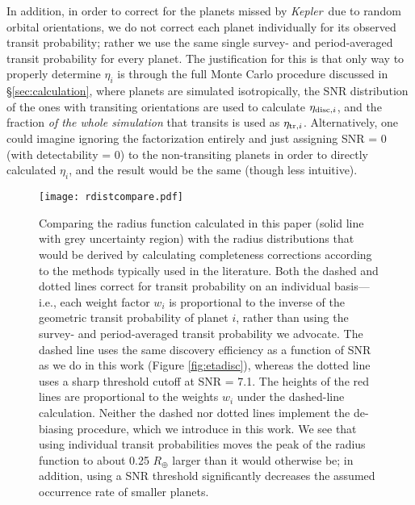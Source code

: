 \documentclass[iop]{emulateapj}
\def\Kepler{\textit{Kepler}}
\def\Rearth{R_\oplus}
\begin{document}
In addition, in order to correct for the planets missed by \Kepler\ due to random orbital orientations, we do not correct each planet individually for its observed transit probability; rather we use the same single survey- and period-averaged transit probability for every planet.  The justification for this is that only way to properly determine $\eta_i$ is through the full Monte Carlo procedure discussed in \S\ref{sec:calculation}, where planets are simulated isotropically, the SNR distribution of the ones with transiting orientations are used to calculate $\eta_{{\rm disc},i}$, and the fraction  \textit{of the whole simulation} that transits is used as $\eta_{{\rm tr},i}$.  Alternatively, one could imagine ignoring the factorization entirely and just assigning SNR = 0 (with detectability = 0) to the non-transiting planets in order to directly calculated $\eta_i$, and the result would be the same (though less intuitive).  

\begin{figure}[t!]
   \centering
   \texttt{[image: rdistcompare.pdf]} %
   \caption{Comparing the radius function calculated in this paper (solid line with grey uncertainty region) with the radius distributions that would be derived by calculating completeness corrections according to the methods typically used in the literature.  Both the dashed and dotted lines correct for transit probability on an individual basis---i.e., each weight factor $w_i$ is proportional to the inverse of the geometric transit probability of planet $i$, rather than using the survey- and period-averaged transit probability we advocate.  The dashed line uses the same discovery efficiency as a function of SNR as we do in this work (Figure \ref{fig:etadisc}), whereas the dotted line uses a sharp threshold cutoff at SNR = 7.1.  The heights of the red lines are proportional to the weights $w_i$ under the dashed-line calculation.  Neither the dashed nor dotted lines implement the de-biasing procedure, which we introduce in this work.  We see that using individual transit probabilities moves the peak of the radius function to about 0.25 $\Rearth$ larger than it would otherwise be; in addition, using a SNR threshold significantly decreases the assumed occurrence rate of smaller planets.}
   \label{fig:rdistcompare}
\end{figure}
\end{document}
